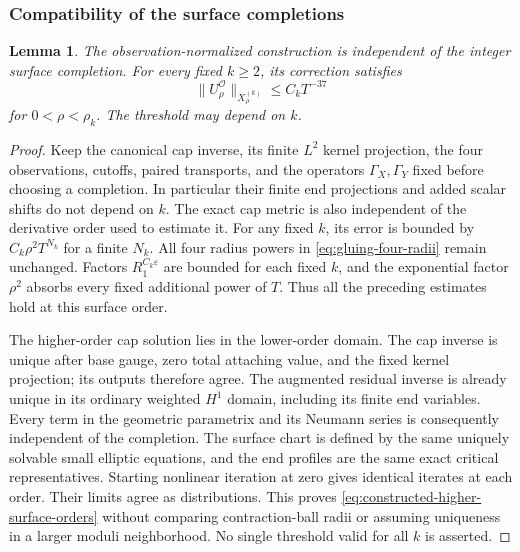 \documentclass[11pt]{amsart}
\newtheorem{lemma}[theorem]{Lemma}
\theoremstyle{definition}
\theoremstyle{remark}
\theoremstyle{plain}
\newcommand{\cO}{\mathcal{O}}
\begin{document}
\subsubsection{Compatibility of the surface completions}

\begin{lemma}\label{lem:constructed-higher-surface-orders}
The observation-normalized construction is independent of the integer
surface completion. For every fixed $k\geq2$, its correction satisfies
\begin{equation}\label{eq:constructed-higher-surface-orders}
                 \|U_\rho^{\cO}\|_{X_\rho^{(k)}}\leq C_kT^{-37}
\end{equation}
for $0<\rho<\rho_k$. The threshold may depend on $k$.
\end{lemma}

\begin{proof}
Keep the canonical cap inverse, its finite $L^2$ kernel projection, the
four observations, cutoffs, paired transports, and the operators
$\Gamma_X,\Gamma_Y$ fixed before choosing a completion. In particular
their finite end projections and added scalar shifts do not depend on
$k$. The exact cap metric is also independent of the derivative order
used to estimate it. For any fixed $k$, its error is bounded by
$C_k\rho^2T^{N_k}$ for a finite $N_k$. All four radius powers in
\eqref{eq:gluing-four-radii} remain unchanged. Factors
$R_1^{C_k\varepsilon}$ are bounded for each fixed $k$, and the
exponential factor $\rho^2$ absorbs every fixed additional power of $T$.
Thus all the preceding estimates hold at this surface order.

The higher-order cap solution lies in the lower-order domain. The cap
inverse is unique after base gauge, zero total attaching value, and the
fixed kernel projection; its outputs therefore agree. The augmented
residual inverse is already unique in its ordinary weighted $H^1$
domain, including its finite end variables. Every term in the geometric
parametrix and its Neumann series is consequently independent of the
completion. The surface chart is defined by the same uniquely solvable
small elliptic equations, and the end profiles are the same exact
critical representatives. Starting nonlinear iteration at zero gives
identical iterates at each order. Their limits agree as distributions.
This proves \eqref{eq:constructed-higher-surface-orders} without comparing
contraction-ball radii or assuming uniqueness in a larger moduli
neighborhood. No single threshold valid for all $k$ is asserted.
\end{proof}
\end{document}
